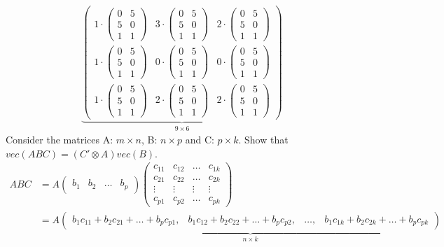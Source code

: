 \documentclass[a4paper]{scrartcl}
\begin{document}
\begin{enumerate}
\begin{solution}
\begin{align*}
		\underbrace{\begin{pmatrix} 1\cdot\begin{pmatrix}0&5\\5&0\\1&1 \end{pmatrix}&3\cdot\begin{pmatrix}0&5\\5&0\\1&1 \end{pmatrix}&2\cdot\begin{pmatrix}0&5\\5&0\\1&1 \end{pmatrix}\\1\cdot\begin{pmatrix}0&5\\5&0\\1&1 \end{pmatrix}&0\cdot\begin{pmatrix}0&5\\5&0\\1&1 \end{pmatrix}&0\cdot\begin{pmatrix}0&5\\5&0\\1&1 \end{pmatrix}\\1\cdot\begin{pmatrix}0&5\\5&0\\1&1 \end{pmatrix}&2\cdot\begin{pmatrix}0&5\\5&0\\1&1 \end{pmatrix}&2\cdot\begin{pmatrix}0&5\\5&0\\1&1 \end{pmatrix}  \end{pmatrix}}_{9\times6}
		\end{align*}
		Consider the matrices A: $m\times n$, B: $n\times p$ and C: $p\times k$. Show that $vec(ABC)=\left(C'\otimes A\right) vec(B)$.
		\begin{align*}
		ABC &= A \begin{pmatrix} b_1 & b_2 & \dots & b_p \end{pmatrix}
		\begin{pmatrix}
		c_{11} &c_{12} &\dots &c_{1k} \\
		c_{21} &c_{22} &\dots &c_{2k} \\
		\vdots &\vdots &\vdots &\vdots\\
		c_{p1} &c_{p2} &\dots &c_{pk}
		\end{pmatrix}\\
		&= A \underbrace{\begin{pmatrix} b_1c_{11}+b_2c_{21}+\dots+b_p c_{p1},& b_1c_{12}+b_2c_{22}+\dots+b_p c_{p2}, & \dots ,& b_1c_{1k}+b_2c_{2k}+\dots+b_p c_{pk}\end{pmatrix}}_{n\times k}
		\end{align*}
		

\end{solution}
\end{enumerate}
\end{document}
